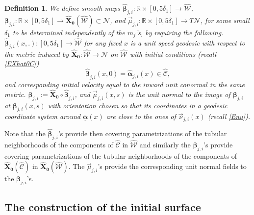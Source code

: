 \documentclass[12pt,namelimits,sumlimits]{amsart}
\newtheorem{definition}[theorem]{Definition}
\theoremstyle{remark}
\numberwithin{equation}{section}
\begin{document}
\addtocounter{equation}{1}
\begin{definition}
\label{Dbnu}
We define smooth maps
${\widehat{\boldsymbol{\beta}}}_{j,i}:{\mathbb{R}}\times[0,5\delta_1]\to{{\widehat{{\mathcal{W}}}}}$,
${\boldsymbol{\beta}}_{j,i}:{\mathbb{R}}\times[0,5\delta_1]\to{\widehat{\boldsymbol{X}}}_{{\boldsymbol{0}}}({{\widehat{{\mathcal{W}}}}})\subset{{\mathcal{N}}}$,
and
${\vec{\mu}}_{j,i}:{\mathbb{R}}\times[0,5\delta_1]\to T{{\mathcal{N}}}$,
for some small $\delta_1$ to be determined independently of the $m_j$'s,
by requiring the following.
${\widehat{\boldsymbol{\beta}}}_{j,i}(x,.):[0,5\delta_1]\to{{\widehat{{\mathcal{W}}}}}$ for any fixed $x$
is a unit speed geodesic with respect to the metric induced by ${\widehat{\boldsymbol{X}}}_{{\boldsymbol{0}}}:{{\widehat{{\mathcal{W}}}}}\to{{\mathcal{N}}}$ on ${{\widehat{{\mathcal{W}}}}}$
with initial conditions 
(recall \ref{EXhat0C})
$$
{\widehat{\boldsymbol{\beta}}}_{j,i}(x,0)= {\widehat{\boldsymbol{\alpha}}}_{j,i}(x) \in {{\widehat{{\mathcal{C}}}}},
$$
and corresponding initial velocity 
equal to the inward unit conormal in the same metric.
${\boldsymbol{\beta}}_{j,i}:={\widehat{\boldsymbol{X}}}_{{\boldsymbol{0}}}\circ{\widehat{\boldsymbol{\beta}}}_{j,i}$,
and 
${\vec{\mu}}_{j,i}(x,s)$ is the unit normal to the image of ${\boldsymbol{\beta}}_{j,i}$ at ${\boldsymbol{\beta}}_{j,i}(x,s)$
with orientation chosen so that its coordinates in a geodesic coordinate system around
${\underline{\boldsymbol{\alpha}}}(x)$ are close to the ones of ${\vec{\nu}}_{{j,i}}(x)$
(recall \ref{Enu}).
\end{definition}

Note that
the ${\widehat{\boldsymbol{\beta}}}_{j,i}$'s provide then covering parametrizations of the tubular neighborhoods of the
components of ${{\widehat{{\mathcal{C}}}}}$ in ${{\widehat{{\mathcal{W}}}}}$
and similarly
the ${\boldsymbol{\beta}}_{j,i}$'s provide covering parametrizations of the tubular neighborhoods of the
components of ${\widehat{\boldsymbol{X}}}_{{\boldsymbol{0}}}({{\widehat{{\mathcal{C}}}}})$ in ${\widehat{\boldsymbol{X}}}_{{\boldsymbol{0}}}({{\widehat{{\mathcal{W}}}}})$.
The ${\vec{\mu}}_{{j,i}}$'s provide the corresponding unit normal fields to the ${\boldsymbol{\beta}}_{j,i}$'s.

\subsection*{The construction of the initial surface}
$\phantom{ab}$
\nopagebreak
\end{document}
